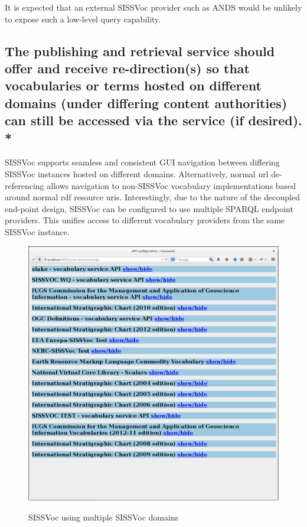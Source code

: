 \documentclass[10pt,a4paper]{article}
\begin{document}
\begin{flushleft}
  \item It is expected that an external SISSVoc provider such as ANDS would be 
  unlikely to expose such a low-level query capability.
   

\subsection{ The publishing and retrieval service should offer and receive
re-direction(s) so that vocabularies or terms hosted on different domains (under
differing content authorities) can still be accessed via the service (if
desired). * }

{
SISSVoc supports seamless and consistent GUI navigation between differing
SISSVoc instances hosted on different domains.
%
Alternatively, normal url de-referencing allows navigation to non-SISSVoc
vocabulary implementations based around normal rdf resource uris.
%
Interestingly, due to the nature of the decoupled end-point design, SISSVoc 
can be configured to use multiple SPARQL endpoint providers. This unifies access
to different vocabulary providers from the same SISSVoc instance. 

\begin{figure}[H]
\centering
\caption{SISSVoc using multiple SISSVoc domains}
\includegraphics[width=12cm]{multipleendpoints}  
\label{fig:test}
\end{figure}

}
\end{flushleft}
\end{document}
